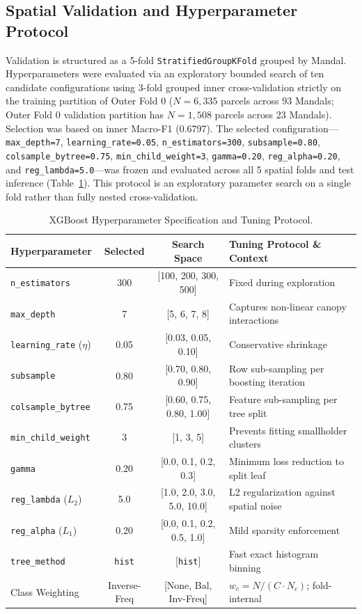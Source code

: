 \documentclass[runningheads]{llncs}
\begin{document}
\subsection{Spatial Validation and Hyperparameter Protocol}
Validation is structured as a 5-fold \texttt{StratifiedGroupKFold} grouped by Mandal. Hyperparameters were evaluated via an exploratory bounded search of ten candidate configurations using 3-fold grouped inner cross-validation strictly on the training partition of Outer Fold 0 ($N = 6{,}335$ parcels across 93 Mandals; Outer Fold 0 validation partition has $N = 1{,}508$ parcels across 23 Mandals). Selection was based on inner Macro-F1 (0.6797). The selected configuration—\texttt{max\_depth=7}, \texttt{learning\_rate=0.05}, \texttt{n\_estimators=300}, \texttt{subsample=0.80}, \texttt{colsample\_bytree=0.75}, \texttt{min\_child\_weight=3}, \texttt{gamma=0.20}, \texttt{reg\_alpha=0.20}, and \texttt{reg\_lambda=5.0}—was frozen and evaluated across all 5 spatial folds and test inference (Table~\ref{tab:hyperparams}). This protocol is an exploratory parameter search on a single fold rather than fully nested cross-validation.

\begin{table}[t]
\centering
\caption{XGBoost Hyperparameter Specification and Tuning Protocol.}
\label{tab:hyperparams}
\small
\begin{tabular}{lccl}
\toprule
\textbf{Hyperparameter} & \textbf{Selected} & \textbf{Search Space} & \textbf{Tuning Protocol \& Context} \\
\midrule
\texttt{n\_estimators} & 300 & [100, 200, 300, 500] & Fixed during exploration \\
\texttt{max\_depth} & 7 & [5, 6, 7, 8] & Captures non-linear canopy interactions \\
\texttt{learning\_rate} ($\eta$) & 0.05 & [0.03, 0.05, 0.10] & Conservative shrinkage \\
\texttt{subsample} & 0.80 & [0.70, 0.80, 0.90] & Row sub-sampling per boosting iteration \\
\texttt{colsample\_bytree} & 0.75 & [0.60, 0.75, 0.80, 1.00] & Feature sub-sampling per tree split \\
\texttt{min\_child\_weight} & 3 & [1, 3, 5] & Prevents fitting smallholder clusters \\
\texttt{gamma} & 0.20 & [0.0, 0.1, 0.2, 0.3] & Minimum loss reduction to split leaf \\
\texttt{reg\_lambda} ($L_2$) & 5.0 & [1.0, 2.0, 3.0, 5.0, 10.0] & L2 regularization against spatial noise \\
\texttt{reg\_alpha} ($L_1$) & 0.20 & [0.0, 0.1, 0.2, 0.5, 1.0] & Mild sparsity enforcement \\
\texttt{tree\_method} & \texttt{hist} & [\texttt{hist}] & Fast exact histogram binning \\
Class Weighting & Inverse-Freq & [None, Bal, Inv-Freq] & $w_c = N / (C \cdot N_c)$; fold-internal \\
\bottomrule
\end{tabular}
\end{table}
\end{document}

